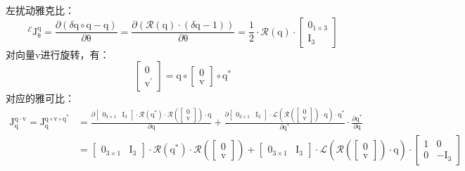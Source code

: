 \documentclass[12pt, onecolumn]{article}
\newcommand\bsm[1]{\boldsymbol{\mathrm{#1}}}
\begin{document}
	左扰动雅克比：
	\begin{equation}
	^\mathcal{E}\bsm{J}^{\bsm{q}}_{\bsm{\theta}}=\frac{\partial \left( \delta\bsm{q}\circ\bsm{q}-\bsm{q}\right) }{\partial \bsm{\theta}}
	=\frac{\partial \left( \mathcal{R}(\bsm{q})\cdot\left( \delta\bsm{q}-\bsm{1}\right) \right) }{\partial \bsm{\theta}}
	=\frac{1}{2}\cdot\mathcal{R}(\bsm{q})\cdot\begin{bmatrix}
			\bsm{0}_{1\times 3}\\\bsm{I}_3
			\end{bmatrix}
	\end{equation}
	对向量$\bsm{v}$进行旋转，有：
	\begin{equation}
	\begin{bmatrix}
		0\\\bsm{v}^\prime
		\end{bmatrix}=\bsm{q}\circ\begin{bmatrix}
	0\\\bsm{v}
	\end{bmatrix}\circ\bsm{q}^*
	\end{equation}
	对应的雅可比：
	\begin{equation}
	\begin{aligned}
		\bsm{J}^{\bsm{q}\cdot\bsm{v}}_{\bsm{q}}=
		\bsm{J}^{\bsm{q}\circ\bsm{v}\circ\bsm{q}^{*}}_{\bsm{q}}&=
		\frac{\partial \begin{bmatrix}
		\bsm{0}_{3\times 1}&\bsm{I}_3
		\end{bmatrix}\cdot\mathcal{R}(\bsm{q}^*)\cdot\mathcal{R}\left(\begin{bmatrix}
		0\\\bsm{v}
		\end{bmatrix} \right)\cdot\bsm{q} }{\partial \bsm{q}}
		+
		\frac{\partial \begin{bmatrix}
		\bsm{0}_{3\times 1}&\bsm{I}_3
		\end{bmatrix}\cdot\mathcal{L}\left( \mathcal{R}\left(\begin{bmatrix}
		0\\\bsm{v}
		\end{bmatrix} \right)\cdot\bsm{q}\right) \cdot\bsm{q}^* }{\partial \bsm{q}^*}
		\cdot\frac{\partial \bsm{q}^*}{\partial \bsm{q}}
		\\&=\begin{bmatrix}
				\bsm{0}_{3\times 1}&\bsm{I}_3
				\end{bmatrix}\cdot\mathcal{R}(\bsm{q}^*)\cdot\mathcal{R}\left(\begin{bmatrix}
				0\\\bsm{v}
				\end{bmatrix} \right)+
			\begin{bmatrix}
					\bsm{0}_{3\times 1}&\bsm{I}_3
					\end{bmatrix}\cdot\mathcal{L}\left( \mathcal{R}\left(\begin{bmatrix}
					0\\\bsm{v}
					\end{bmatrix} \right)\cdot\bsm{q}\right)
					\cdot
					\begin{bmatrix}
							1&\bsm{0}\\
							\bsm{0}&-\bsm{I}_3
							\end{bmatrix}
	\end{aligned}
	\end{equation}
\end{document}
